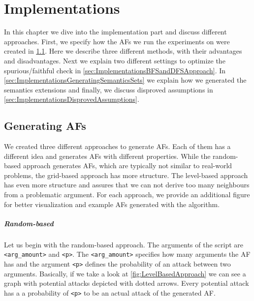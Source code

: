 \chapter{Implementations}
In this chapter we dive into the implementation part and discuss different approaches. First, we specify how the AFs we run the experiments on were created in \cref{sec:ImplementationsCreatingAFs}. Here we describe three different methods, with their advantages and disadvantages. Next we explain two different settings to optimize the spurious/faithful check in \cref{sec:ImplementationsBFSandDFSApproach}. In \cref{sec:ImplementationsGeneratingSemanticsSets} we explain how we generated the semantics extensions and finally, we discuss disproved assumptions in \cref{sec:ImplementationsDisprovedAssumptions}.

\section{Generating AFs}
\label{sec:ImplementationsCreatingAFs}
We created three different approaches to generate AFs. Each of them has a different idea and generates AFs with different properties. While the random-based approach generates AFs, which are typically not similar to real-world problems, the grid-based approach has more structure. The level-based approach has even more structure and assures that we can not derive too many neighbours from a problematic argument. For each approach, we provide an additional figure for better visualization and example AFs generated with the algorithm.

\paragraph{Random-based} Let us begin with the random-based approach. The arguments of the script are \texttt{<arg\_amount>} and \texttt{<p>}. The \texttt{<arg\_amount>} specifies how many arguments the AF has and the argument \texttt{<p>} defines the probability of an attack between two arguments. Basically, if we take a look at \cref{fig:LevelBasedApproach} we can see a graph with potential attacks depicted with dotted arrows. Every potential attack has a a probability of \texttt{<p>} to be an actual attack of the generated AF.


